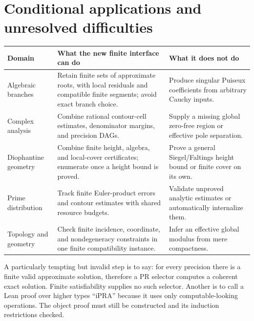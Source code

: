 \documentclass[11pt]{article}
\begin{document}
\section{Conditional applications and unresolved difficulties}
\begin{longtable}{p{.22\linewidth}p{.38\linewidth}p{.31\linewidth}}\toprule
Domain & What the new finite interface can do & What it does not do\\\midrule\endhead
Algebraic branches & Retain finite sets of approximate roots, with local residuals and compatible finite segments; avoid exact branch choice. & Produce singular Puiseux coefficients from arbitrary Cauchy inputs.\\
Complex analysis & Combine rational contour-cell estimates, denominator margins, and precision DAGs. & Supply a missing global zero-free region or effective pole separation.\\
Diophantine geometry & Combine finite height, algebra, and local-cover certificates; enumerate once a height bound is proved. & Prove a general Siegel/Faltings height bound or finite cover on its own.\\
Prime distribution & Track finite Euler-product errors and contour estimates with shared resource budgets. & Validate unproved analytic estimates or automatically internalize them.\\
Topology and geometry & Check finite incidence, coordinate, and nondegeneracy constraints in one finite compatibility instance. & Infer an effective global modulus from mere compactness.\\\bottomrule\end{longtable}

A particularly tempting but invalid step is to say: for every precision there is a finite valid approximate solution, therefore a PR selector computes a coherent exact solution. Finite satisfiability supplies no such selector. Another is to call a Lean proof over higher types ``iPRA'' because it uses only computable-looking operations. The object proof must still be constructed and its induction restrictions checked.
\end{document}
